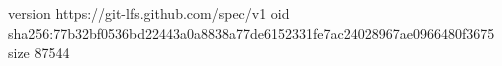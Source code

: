 version https://git-lfs.github.com/spec/v1
oid sha256:77b32bf0536bd22443a0a8838a77de6152331fe7ac24028967ae0966480f3675
size 87544
